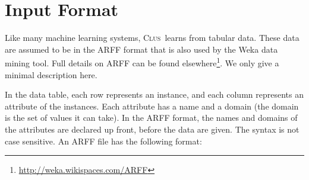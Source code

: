 \documentclass[a4paper]{report}
\newcommand{\clus}{\textsc{Clus}}
\begin{document}
% 
% 
% 
%  
% 
% 
% 

%
\chapter{Input Format}
\label{ch:data}

Like many machine learning systems, \clus\ learns from tabular data. These data are assumed to be in the ARFF format that is also used by the Weka data mining tool.  Full details on ARFF can be found elsewhere\footnote{\url{http://weka.wikispaces.com/ARFF}}. We only give a minimal description here.

In the data table, each row represents an instance, and each column represents an attribute of the instances.  Each attribute has a name and a domain (the domain is the set of values it can take). In the ARFF format, the names and domains of the attributes are declared up front, before the data are given. The syntax is not case sensitive.
%
An ARFF file has the following format:
\end{document}
